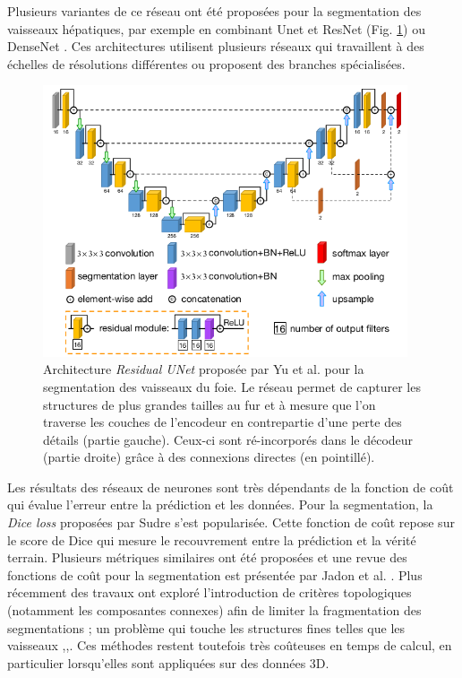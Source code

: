       Plusieurs variantes de ce réseau ont été proposées pour la segmentation des vaisseaux hépatiques, par exemple en combinant Unet et ResNet \cite{yu2019_liver_ResUnet}(Fig. \ref{fig:yu_resunet}) ou DenseNet \cite{Li2018_DenseUnet}. Ces architectures utilisent plusieurs réseaux qui travaillent à des échelles de résolutions différentes ou proposent des branches spécialisées.
      \begin{figure}[!ht]
        \centering
        \includegraphics[height=8cm]{Images/Residual_Unet_Yu.png}
        \caption{Architecture \textit{Residual UNet} proposée par Yu et al. \cite{yu2019_liver_ResUnet} pour la segmentation des vaisseaux du foie. Le réseau permet de capturer les structures de plus grandes tailles au fur et à mesure que l'on traverse les couches de l'encodeur en contrepartie d'une perte des détails (partie gauche). Ceux-ci sont ré-incorporés dans le décodeur (partie droite) grâce à des connexions directes (en pointillé). }
        \label{fig:yu_resunet}
      \end{figure}
      Les résultats des réseaux de neurones sont très dépendants de la fonction de coût qui évalue l'erreur entre la prédiction et les données. Pour la segmentation, la \textit{Dice loss} proposées par Sudre \cite{Sudre2017_DiceLoss} s'est popularisée. Cette fonction de coût repose sur le score de Dice qui mesure le recouvrement entre la prédiction et la vérité terrain. Plusieurs métriques similaires ont été proposées et une revue des fonctions de coût pour la segmentation est présentée par Jadon et al. \cite{Jadon2020_survey_seg_loss}. Plus récemment des travaux ont exploré l'introduction de critères topologiques (notamment les composantes connexes) afin de limiter la fragmentation des segmentations ; un problème qui touche les structures fines telles que les vaisseaux \cite{Ventura2017iterative_topo},\cite{Hu2019_topo_homo_persi},\cite{Clough2019_topo_homo_persi}. Ces méthodes restent toutefois très coûteuses en temps de calcul, en particulier lorsqu'elles sont appliquées sur des données 3D. 

